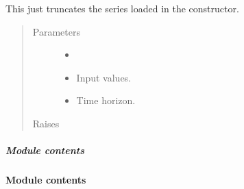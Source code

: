 \documentclass[letterpaper,10pt,english]{sphinxmanual}
\begin{document}
\begin{fulllineitems}
\begin{fulllineitems}
\label{\detokenize{LDS.LDS.ts:LDS.LDS.ts.time_series.TimeSeries.solve}}
\sphinxAtStartPar
This just truncates the series loaded in the constructor.
\begin{quote}\begin{description}
\item[{Parameters}] \leavevmode\begin{itemize}
\item {} 
\sphinxAtStartPar
{} \textendash{} 

\item {} 
\sphinxAtStartPar
{} \textendash{} Input values.

\item {} 
\sphinxAtStartPar
{} \textendash{} Time horizon.

\end{itemize}

\item[{Raises}] \leavevmode
\sphinxAtStartPar
{} \textendash{} 

\end{description}\end{quote}

\end{fulllineitems}


\end{fulllineitems}



\subparagraph{Module contents}
\label{\detokenize{LDS.LDS.ts:module-LDS.LDS.ts}}\label{\detokenize{LDS.LDS.ts:module-contents}}

\paragraph{Module contents}
\label{\detokenize{LDS.LDS:module-LDS.LDS}}\label{\detokenize{LDS.LDS:module-contents}}
\end{document}

